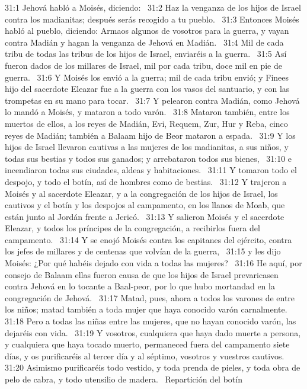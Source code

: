 31:1 Jehová habló a Moisés, diciendo:  
31:2 Haz la venganza de los hijos de Israel contra los madianitas; después serás recogido a tu pueblo.  
31:3 Entonces Moisés habló al pueblo, diciendo: Armaos algunos de vosotros para la guerra, y vayan contra Madián y hagan la venganza de Jehová en Madián.  
31:4 Mil de cada tribu de todas las tribus de los hijos de Israel, enviaréis a la guerra.  
31:5 Así fueron dados de los millares de Israel, mil por cada tribu, doce mil en pie de guerra.  
31:6 Y Moisés los envió a la guerra; mil de cada tribu envió; y Finees hijo del sacerdote Eleazar fue a la guerra con los vasos del santuario, y con las trompetas en su mano para tocar.  
31:7 Y pelearon contra Madián, como Jehová lo mandó a Moisés, y mataron a todo varón.  
31:8 Mataron también, entre los muertos de ellos, a los reyes de Madián, Evi, Requem, Zur, Hur y Reba, cinco reyes de Madián; también a Balaam hijo de Beor mataron a espada.  
31:9 Y los hijos de Israel llevaron cautivas a las mujeres de los madianitas, a sus niños, y todas sus bestias y todos sus ganados; y arrebataron todos sus bienes,  
31:10 e incendiaron todas sus ciudades, aldeas y habitaciones.  
31:11 Y tomaron todo el despojo, y todo el botín, así de hombres como de bestias.  
31:12 Y trajeron a Moisés y al sacerdote Eleazar, y a la congregación de los hijos de Israel, los cautivos y el botín y los despojos al campamento, en los llanos de Moab, que están junto al Jordán frente a Jericó.  
31:13 Y salieron Moisés y el sacerdote Eleazar, y todos los príncipes de la congregación, a recibirlos fuera del campamento.  
31:14 Y se enojó Moisés contra los capitanes del ejército, contra los jefes de millares y de centenas que volvían de la guerra,  
31:15 y les dijo Moisés: ¿Por qué habéis dejado con vida a todas las mujeres?  
31:16 He aquí, por consejo de Balaam ellas fueron causa de que los hijos de Israel prevaricasen contra Jehová en lo tocante a Baal-peor, por lo que hubo mortandad en la congregación de Jehová.  
31:17 Matad, pues, ahora a todos los varones de entre los niños; matad también a toda mujer que haya conocido varón carnalmente.  
31:18 Pero a todas las niñas entre las mujeres, que no hayan conocido varón, las dejaréis con vida.  
31:19 Y vosotros, cualquiera que haya dado muerte a persona, y cualquiera que haya tocado muerto, permaneced fuera del campamento siete días, y os purificaréis al tercer día y al séptimo, vosotros y vuestros cautivos.  
31:20 Asimismo purificaréis todo vestido, y toda prenda de pieles, y toda obra de pelo de cabra, y todo utensilio de madera.  
Repartición del botín  
